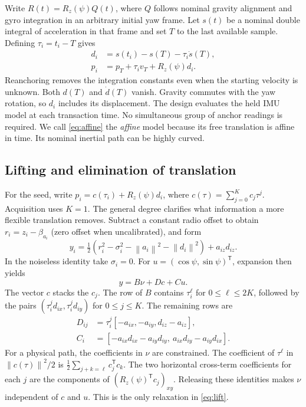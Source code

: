 \documentclass{IEEEtaes}
\newcommand{\rz}{R_z}
\newcommand{\norm}[1]{\left\lVert#1\right\rVert}
\newcommand{\trans}{^{\mathsf T}}
\begin{document}
Write \(R(t)=\rz(\psi)Q(t)\), where \(Q\) follows nominal gravity alignment and gyro integration in an arbitrary initial yaw frame. Let \(s(t)\) be a nominal double integral of acceleration in that frame and set \(T\) to the last available sample. Defining \(\tau_i=t_i-T\) gives
\begin{align}
 d_i &= s(t_i)-s(T)-\tau_i\dot s(T),\nonumber\\
 p_i &= p_T+\tau_i v_T+\rz(\psi)d_i . \label{eq:affine}
\end{align}
Reanchoring removes the integration constants even when the starting velocity is unknown. Both \(d(T)\) and \(\dot d(T)\) vanish. Gravity commutes with the yaw rotation, so \(d_i\) includes its displacement. The design evaluates the held IMU model at each transaction time. No simultaneous group of anchor readings is required. We call \eqref{eq:affine} the \emph{affine} model because its free translation is affine in time. Its nominal inertial path can be highly curved.

\subsection{Lifting and elimination of translation}
For the seed, write \(p_i=c(\tau_i)+\rz(\psi)d_i\), where \(c(\tau)=\sum_{j=0}^{K}c_j\tau^j\). Acquisition uses \(K=1\). The general degree clarifies what information a more flexible translation removes. Subtract a constant radio offset to obtain \(r_i=z_i-\beta_{a_i}\) (zero offset when uncalibrated), and form
\begin{equation}
 y_i=\tfrac12(r_i^2-\sigma_i^2-\norm{a_i}^2-\norm{d_i}^2)
              +a_{iz}d_{iz}. \label{eq:y}
\end{equation}
In the noiseless identity take \(\sigma_i=0\). For \(u=(\cos\psi,\sin\psi)\trans\), expansion then yields
\begin{equation}
 y=B\nu+Dc+Cu . \label{eq:lift}
\end{equation}
The vector \(c\) stacks the \(c_j\). The row of \(B\) contains \(\tau_i^\ell\) for \(0\le\ell\le 2K\), followed by the pairs \((\tau_i^j d_{ix},\tau_i^j d_{iy})\) for \(0\le j\le K\). The remaining rows are
\begin{align}
 D_{ij}&=\tau_i^j[-a_{ix},-a_{iy},d_{iz}-a_{iz}],\nonumber\\
 C_i&=[-a_{ix}d_{ix}-a_{iy}d_{iy},\ a_{ix}d_{iy}-a_{iy}d_{ix}].
 \label{eq:rows}
\end{align}
For a physical path, the coefficients in \(\nu\) are constrained. The coefficient of \(\tau^\ell\) in \(\norm{c(\tau)}^2/2\) is \(\tfrac12\sum_{j+k=\ell} c_j\trans c_k\). The two horizontal cross-term coefficients for each \(j\) are the components of \((\rz(\psi)\trans c_j)_{xy}\). Releasing these identities makes \(\nu\) independent of \(c\) and \(u\). This is the only relaxation in \eqref{eq:lift}.
\end{document}
